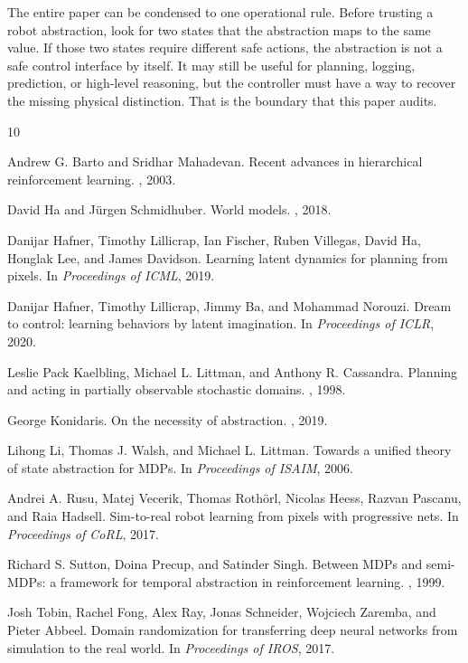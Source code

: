 \documentclass{article}
\begin{document}
The entire paper can be condensed to one operational rule. Before trusting a
robot abstraction, look for two states that the abstraction maps to the same
value. If those two states require different safe actions, the abstraction is not
a safe control interface by itself. It may still be useful for planning, logging,
prediction, or high-level reasoning, but the controller must have a way to
recover the missing physical distinction. That is the boundary that this paper
audits.

\begin{thebibliography}{10}

Andrew G. Barto and Sridhar Mahadevan.
\newblock Recent advances in hierarchical reinforcement learning.
, 2003.

David Ha and J{\"u}rgen Schmidhuber.
\newblock World models.
, 2018.

Danijar Hafner, Timothy Lillicrap, Ian Fischer, Ruben Villegas, David Ha,
Honglak Lee, and James Davidson.
\newblock Learning latent dynamics for planning from pixels.
\newblock In {\em Proceedings of ICML}, 2019.

Danijar Hafner, Timothy Lillicrap, Jimmy Ba, and Mohammad Norouzi.
\newblock Dream to control: learning behaviors by latent imagination.
\newblock In {\em Proceedings of ICLR}, 2020.

Leslie Pack Kaelbling, Michael L. Littman, and Anthony R. Cassandra.
\newblock Planning and acting in partially observable stochastic domains.
, 1998.

George Konidaris.
\newblock On the necessity of abstraction.
, 2019.

Lihong Li, Thomas J. Walsh, and Michael L. Littman.
\newblock Towards a unified theory of state abstraction for {MDPs}.
\newblock In {\em Proceedings of ISAIM}, 2006.

Andrei A. Rusu, Matej Vecerik, Thomas Roth{\"o}rl, Nicolas Heess,
Razvan Pascanu, and Raia Hadsell.
\newblock Sim-to-real robot learning from pixels with progressive nets.
\newblock In {\em Proceedings of CoRL}, 2017.

Richard S. Sutton, Doina Precup, and Satinder Singh.
\newblock Between {MDPs} and semi-{MDPs}: a framework for temporal abstraction
in reinforcement learning.
, 1999.

Josh Tobin, Rachel Fong, Alex Ray, Jonas Schneider, Wojciech Zaremba, and Pieter
Abbeel.
\newblock Domain randomization for transferring deep neural networks from
simulation to the real world.
\newblock In {\em Proceedings of IROS}, 2017.

\end{thebibliography}
\end{document}
